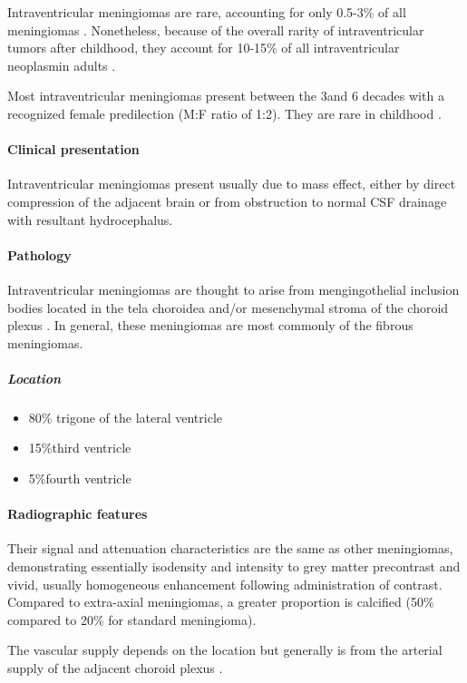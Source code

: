 Intraventricular meningiomas are rare, accounting for only 0.5-3\% of all meningiomas . Nonetheless, because of the overall rarity of intraventricular tumors after childhood, they account for 10-15\% of all intraventricular neoplasmin adults .

Most intraventricular meningiomas present between the 3and 6 decades with a recognized female predilection (M:F ratio of 1:2). They are rare in childhood .

\paragraph{Clinical presentation}

Intraventricular meningiomas present usually due to mass effect, either by direct compression of the adjacent brain or from obstruction to normal CSF drainage with resultant hydrocephalus.

\paragraph{Pathology}

Intraventricular meningiomas are thought to arise from mengingothelial inclusion bodies located in the tela choroidea and/or mesenchymal stroma of the choroid plexus . In general, these meningiomas are most commonly of the fibrous meningiomas.

\subparagraph{Location}

\begin{itemize}
	\tightlist
	\item
	80\% trigone of the lateral ventricle
	\item
	15\%third ventricle
	\item
	5\%fourth ventricle
\end{itemize}

\paragraph{Radiographic features}

Their signal and attenuation characteristics are the same as other meningiomas, demonstrating essentially isodensity and intensity to grey matter precontrast and vivid, usually homogeneous enhancement following administration of contrast. Compared to extra-axial meningiomas, a greater proportion is calcified (50\% compared to 20\% for standard meningioma).

The vascular supply depends on the location but generally is from the arterial supply of the adjacent choroid plexus .

